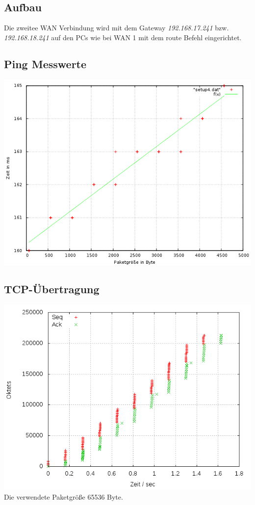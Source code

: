 \documentclass[a4paper,10pt]{article}
\begin{document}
\subsection{Aufbau}
Die zweitee WAN Verbindung wird mit dem Gateway \textit{192.168.17.241} bzw. \textit{192.168.18.241} auf den PCs wie bei WAN 1 mit dem route Befehl eingerichtet.

\subsection{Ping Messwerte}
\includegraphics[scale=0.75]{ping_setup_wan2.png}

\subsection{TCP-Übertragung}
\includegraphics[scale=0.75]{setup_wan2.png}
Die verwendete Paketgröße 65536 Byte.
\end{document}
